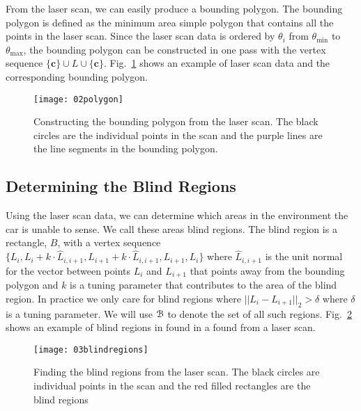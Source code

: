 From the laser scan, we can easily produce a bounding polygon. The bounding
polygon is defined as the minimum area simple polygon that contains all the
points in the laser scan. Since the laser scan data is ordered by $\theta_i$
from $\theta_{\min}$ to $\theta_{\max}$, the bounding polygon can be
constructed in one pass with the vertex sequence $\{\mathbf{c}\} \cup L \cup
\{\mathbf{c}\}$. Fig.~\ref{fig:polygon} shows an example of laser scan
data and the corresponding bounding polygon.

\begin{figure}[ht]

    \centering
    \texttt{[image: 02polygon]}

    \caption{Constructing the bounding polygon from the laser scan. The black
        circles are the individual points in the scan and the purple lines
        are the line segments in the bounding polygon.}

    \label{fig:polygon}
\end{figure}

\subsection{Determining the Blind Regions}

\label{sec:blindregions}

Using the laser scan data, we can determine which areas in the environment the
car is unable to sense. We call these areas blind regions. The blind region is
a rectangle, $B$, with a vertex sequence $\{L_i, L_i + k \cdot \hat{L}_{i, i +
1}, L_{i + 1} + k \cdot \hat{L}_{i, i + 1}, L_{i + 1}, L_i\}$ where
$\hat{L}_{i, i + 1}$ is the unit normal for the vector between points $L_i$ and
$L_{i + 1}$ that points away from the bounding polygon and $k$ is a tuning
parameter that contributes to the area of the blind region. In practice we only
care for blind regions where $||L_i - L_{i + 1}||_2 > \delta$ where $\delta$ is
a tuning parameter. We will use ${{\mathcal{B}}}$ to denote the set of all such regions.
Fig.~\ref{fig:blindregions} shows an example of blind regions in found in a
found from a laser scan.

\begin{figure}[ht]

    \centering
    \texttt{[image: 03blindregions]}

    \caption{Finding the blind regions from the laser scan. The black circles
        are individual points in the scan and the red filled rectangles are the
        blind regions}

    \label{fig:blindregions}
\end{figure}

